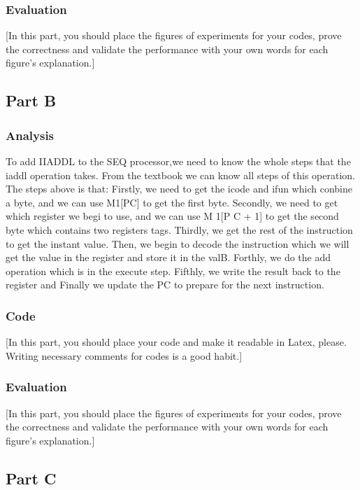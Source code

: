 \documentclass{article}
\begin{document}
\subsubsection{Evaluation}

[In this part, you should place the figures of experiments for your codes, prove the correctness and validate the performance with your own words for each figure’s explanation.]

\subsection{Part B}

\subsubsection{Analysis}

To add IIADDL to the SEQ processor,we need to know the whole steps that the iaddl operation takes. From the textbook we can know all steps of this operation.
The steps above is that:
Firstly, we need to get the icode and ifun which conbine a byte, and we can use M1[PC] to get the first byte.
Secondly, we need to get which register we begi to use, and we can use M 1[P C + 1] to get the second byte which contains two registers tags.
Thirdly, we get the rest of the instruction to get the instant value. Then, we begin to decode the instruction which we will get the value in the register and store it in the valB.
Forthly, we do the add operation which is in the execute step.
Fifthly, we write the result back to the register and Finally we update the PC to prepare for the next instruction.

\subsubsection{Code}

[In this part, you should place your code and make it readable in Latex, please. Writing necessary comments for codes is a good habit.]

\subsubsection{Evaluation}

[In this part, you should place the figures of experiments for your codes, prove the correctness and validate the performance with your own words for each figure’s explanation.]

\subsection{Part C}
\end{document}
